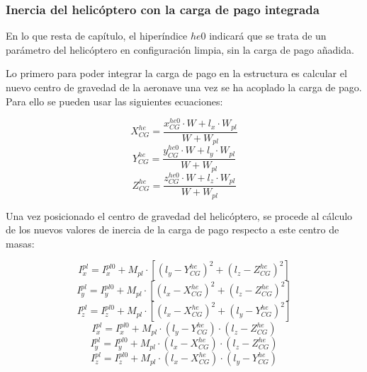 \subsubsection*{Inercia del helicóptero con la carga de pago integrada}

En lo que resta de capítulo, el hiperíndice \emph{$he0$} indicará que se trata de un parámetro del helicóptero en configuración limpia, sin la carga de pago añadida.

Lo primero para poder integrar la carga de pago en la estructura es calcular el nuevo centro de gravedad de la aeronave una vez se ha acoplado la carga de pago. Para ello se pueden usar las siguientes ecuaciones:

\begin{equation}
	X_{CG}^{he}=\frac{x_{CG}^{he0}\cdot W+l_x\cdot W_{pl}}{W+W_{pl}}
\end{equation}
\begin{equation}
	Y_{CG}^{he}=\frac{y_{CG}^{he0}\cdot W+l_y\cdot W_{pl}}{W+W_{pl}}
\end{equation}
\begin{equation}
	Z_{CG}^{he}=\frac{z_{CG}^{he0}\cdot W+l_z\cdot W_{pl}}{W+W_{pl}}
\end{equation}

Una vez posicionado el centro de gravedad del helicóptero, se procede al cálculo de los nuevos valores de inercia de la carga de pago respecto a este centro de masas:

\begin{equation}
I_x^{pl}=I_x^{pl0}+M_{pl}\cdot[(l_y-Y_{CG}^{he})^2+(l_z-Z_{CG}^{he})^2]
\end{equation}
\begin{equation}
I_y^{pl}=I_y^{pl0}+M_{pl}\cdot[(l_x-X_{CG}^{he})^2+(l_z-Z_{CG}^{he})^2]
\end{equation}
\begin{equation}
I_z^{pl}=I_z^{pl0}+M_{pl}\cdot[(l_x-X_{CG}^{he})^2+(l_y-Y_{CG}^{he})^2]
\end{equation}
\begin{equation}
I_x^{pl}=I_x^{pl0}+M_{pl}\cdot(l_y-Y_{CG}^{he})\cdot(l_z-Z_{CG}^{he})
\end{equation}
\begin{equation}
I_y^{pl}=I_y^{pl0}+M_{pl}\cdot(l_x-X_{CG}^{he})\cdot(l_z-Z_{CG}^{he})
\end{equation}
\begin{equation}
I_z^{pl}=I_z^{pl0}+M_{pl}\cdot(l_x-X_{CG}^{he})\cdot(l_y-Y_{CG}^{he})
\end{equation}

